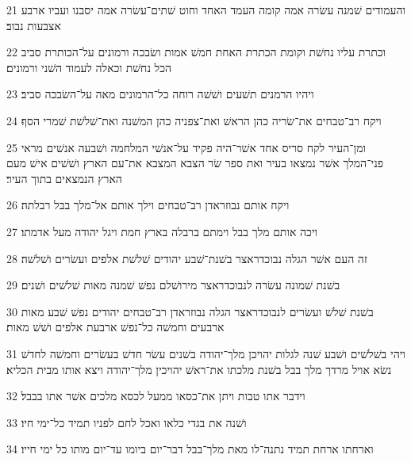 \par 21 והעמודים שׁמנה עשׂרה אמה קומה העמד האחד וחוט שׁתים־עשׂרה אמה יסבנו ועביו ארבע אצבעות נבוב׃
\par 22 וכתרת עליו נחשׁת וקומת הכתרת האחת חמשׁ אמות ושׂבכה ורמונים על־הכותרת סביב הכל נחשׁת וכאלה לעמוד השׁני ורמונים׃
\par 23 ויהיו הרמנים תשׁעים ושׁשׁה רוחה כל־הרמונים מאה על־השׂבכה סביב׃
\par 24 ויקח רב־טבחים את־שׂריה כהן הראשׁ ואת־צפניה כהן המשׁנה ואת־שׁלשׁת שׁמרי הסף׃
\par 25 ומן־העיר לקח סריס אחד אשׁר־היה פקיד על־אנשׁי המלחמה ושׁבעה אנשׁים מראי פני־המלך אשׁר נמצאו בעיר ואת ספר שׂר הצבא המצבא את־עם הארץ ושׁשׁים אישׁ מעם הארץ הנמצאים בתוך העיר׃
\par 26 ויקח אותם נבוזראדן רב־טבחים וילך אותם אל־מלך בבל רבלתה׃
\par 27 ויכה אותם מלך בבל וימתם ברבלה בארץ חמת ויגל יהודה מעל אדמתו׃
\par 28 זה העם אשׁר הגלה נבוכדראצר בשׁנת־שׁבע יהודים שׁלשׁת אלפים ועשׂרים ושׁלשׁה׃
\par 29 בשׁנת שׁמונה עשׂרה לנבוכדראצר מירושׁלם נפשׁ שׁמנה מאות שׁלשׁים ושׁנים׃
\par 30 בשׁנת שׁלשׁ ועשׂרים לנבוכדראצר הגלה נבוזראדן רב־טבחים יהודים נפשׁ שׁבע מאות ארבעים וחמשׁה כל־נפשׁ ארבעת אלפים ושׁשׁ מאות׃
\par 31 ויהי בשׁלשׁים ושׁבע שׁנה לגלות יהויכן מלך־יהודה בשׁנים עשׂר חדשׁ בעשׂרים וחמשׁה לחדשׁ נשׂא אויל מרדך מלך בבל בשׁנת מלכתו את־ראשׁ יהויכין מלך־יהודה ויצא אותו מבית הכליא׃
\par 32 וידבר אתו טבות ויתן את־כסאו ממעל לכסא מלכים אשׁר אתו בבבל׃
\par 33 ושׁנה את בגדי כלאו ואכל לחם לפניו תמיד כל־ימי חיו׃
\par 34 וארחתו ארחת תמיד נתנה־לו מאת מלך־בבל דבר־יום ביומו עד־יום מותו כל ימי חייו׃


